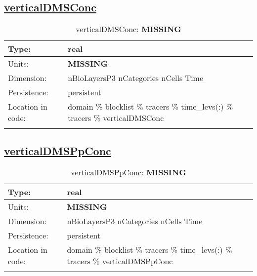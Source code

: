 \subsection[verticalDMSConc]{\hyperref[sec:var_tab_tracers]{verticalDMSConc}}
\label{subsec:var_sec_tracers_verticalDMSConc}
\begin{center}
\begin{longtable}{| p{2.0in} | p{4.0in} |}
        \hline 
        Type: & real \\
        \hline 
        Units: & {\bf \color{red} MISSING} \\
        \hline 
        Dimension: & nBioLayersP3 nCategories nCells Time \\
        \hline 
        Persistence: & persistent \\
        \hline 
         Location in code: & domain \% blocklist \% tracers \% time\_levs(:) \% tracers \% verticalDMSConc \\
         \hline 
    \caption{verticalDMSConc: {\bf \color{red} MISSING}}
\end{longtable}
\end{center}
\subsection[verticalDMSPpConc]{\hyperref[sec:var_tab_tracers]{verticalDMSPpConc}}
\label{subsec:var_sec_tracers_verticalDMSPpConc}
\begin{center}
\begin{longtable}{| p{2.0in} | p{4.0in} |}
        \hline 
        Type: & real \\
        \hline 
        Units: & {\bf \color{red} MISSING} \\
        \hline 
        Dimension: & nBioLayersP3 nCategories nCells Time \\
        \hline 
        Persistence: & persistent \\
        \hline 
         Location in code: & domain \% blocklist \% tracers \% time\_levs(:) \% tracers \% verticalDMSPpConc \\
         \hline 
    \caption{verticalDMSPpConc: {\bf \color{red} MISSING}}
\end{longtable}
\end{center}
